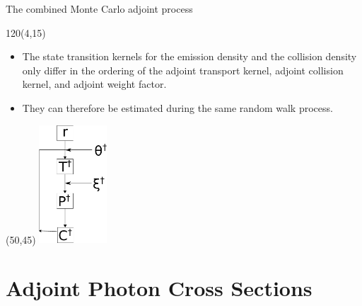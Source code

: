 \documentclass{beamer}
\begin{document}
\begin{frame}{The combined Monte Carlo adjoint process}

  \begin{textblock}{120}(4,15)
    \begin{itemize}
      \item The state transition kernels for the emission density and the 
        collision density only differ in the ordering of the adjoint transport
        kernel, adjoint collision kernel, and adjoint weight factor.
      \item They can therefore be estimated during the same random walk process.
    \end{itemize}
  \end{textblock}

  \begin{textblock}{20}(50,45)
    \includegraphics[width=1.0in]{figures/adjoint_random_walk_process.pdf}
  \end{textblock}

\end{frame}

\section{Adjoint Photon Cross Sections}
\end{document}
